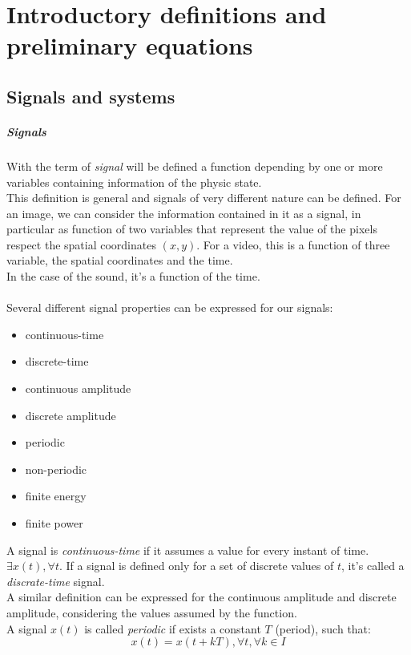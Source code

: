 \chapter{Introductory definitions and preliminary equations}

\section{Signals and systems}
\paragraph{Signals}
With the term of \textit{signal} will be defined a function depending by one or more variables containing information of the physic state.\\
This definition is general and signals of very different nature can be defined. For an image, we can consider the information contained in it as a signal, in particular as function of two variables that represent the value of the pixels respect the spatial coordinates $(x,y)$. For a video, this is a function of three variable, the spatial coordinates and the time.\\
In the case of the sound, it's a function of the time. \\\\
Several different signal properties can be expressed for our signals:
\begin{itemize}
    \item continuous-time
    \item discrete-time
    \item continuous amplitude
    \item discrete amplitude
    \item periodic
    \item non-periodic
    \item finite energy
    \item finite power
\end{itemize}
A signal is \textit{continuous-time} if it assumes a value for every instant of time. $\exists x(t),\forall t$. If a signal is defined only for a set of discrete values of $t$, it's called a \textit{discrate-time} signal.\\ 
A similar definition can be expressed for the continuous amplitude and discrete amplitude, considering the values assumed by the function.\\
A signal $x(t)$ is called \textit{periodic} if exists a constant $T$ (period), such that:
\[ x(t) = x(t + kT), \forall t, \forall k \in I\]
